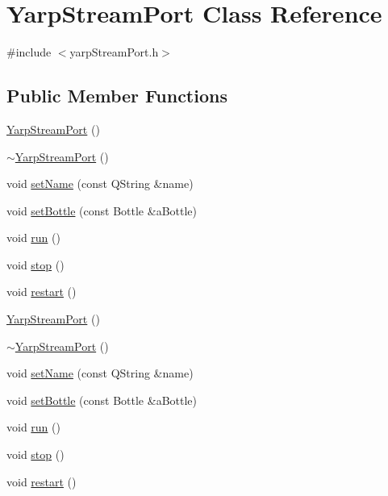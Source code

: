 \hypertarget{class_yarp_stream_port}{
\section{YarpStreamPort Class Reference}
\label{class_yarp_stream_port}
}


{\ttfamily \#include $<$yarpStreamPort.h$>$}\subsection*{Public Member Functions}
\begin{DoxyCompactItemize}
\item 
\hyperlink{class_yarp_stream_port_aa9bc88cfd89f533676960ba59629af84}{YarpStreamPort} ()
\item 
\hyperlink{class_yarp_stream_port_ac0923822f1b4ab48ef2fd7600184be98}{$\sim$YarpStreamPort} ()
\item 
void \hyperlink{class_yarp_stream_port_a82197dfe08009bf57b9892ba8c091bbc}{setName} (const QString \&name)
\item 
void \hyperlink{class_yarp_stream_port_a6c55a434cf560c89f93d1a7d02b42a98}{setBottle} (const Bottle \&aBottle)
\item 
void \hyperlink{class_yarp_stream_port_aaeea4c0a2bae6c5a257935227df3cddb}{run} ()
\item 
void \hyperlink{class_yarp_stream_port_ae1c105a567b759d0f0c0c0068e0279a1}{stop} ()
\item 
void \hyperlink{class_yarp_stream_port_acc997d769ece47a6c88b1437225c0039}{restart} ()
\item 
\hyperlink{class_yarp_stream_port_aa9bc88cfd89f533676960ba59629af84}{YarpStreamPort} ()
\item 
\hyperlink{class_yarp_stream_port_ac0923822f1b4ab48ef2fd7600184be98}{$\sim$YarpStreamPort} ()
\item 
void \hyperlink{class_yarp_stream_port_a82197dfe08009bf57b9892ba8c091bbc}{setName} (const QString \&name)
\item 
void \hyperlink{class_yarp_stream_port_a6c55a434cf560c89f93d1a7d02b42a98}{setBottle} (const Bottle \&aBottle)
\item 
void \hyperlink{class_yarp_stream_port_aaeea4c0a2bae6c5a257935227df3cddb}{run} ()
\item 
void \hyperlink{class_yarp_stream_port_ae1c105a567b759d0f0c0c0068e0279a1}{stop} ()
\item 
void \hyperlink{class_yarp_stream_port_acc997d769ece47a6c88b1437225c0039}{restart} ()
\end{DoxyCompactItemize}
